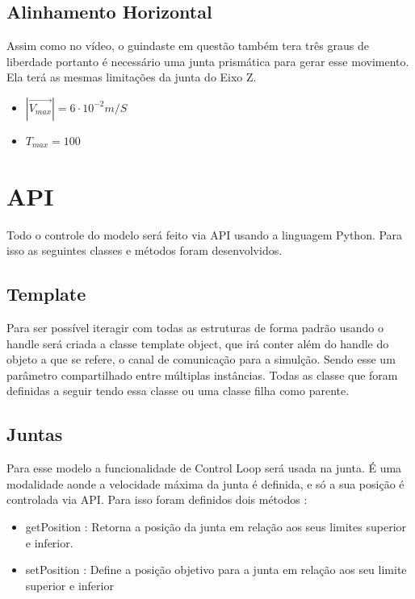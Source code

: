 \documentclass{article}
\begin{document}
        \subsection{Alinhamento Horizontal}

            Assim como no vídeo, o guindaste em questão também tera três graus de liberdade portanto é necessário uma junta 
            prismática para gerar esse movimento. Ela terá as mesmas limitações da junta do Eixo Z.
            \begin{itemize}
                \item \(\left|\vec{V_{max}}\right| = 6\cdot 10^{-2} m/S\)
                \item \(T_{max} = 100\)
            \end{itemize}
    \section{API}

        Todo o controle do modelo será feito via API usando a linguagem Python. Para isso as seguintes classes e métodos foram desenvolvidos. 
        \subsection{Template}

            Para ser possível iteragir com todas as estruturas de forma padrão usando o handle será criada a classe template object, que irá conter além do handle do objeto 
            a que se refere, o canal de comunicação para a simulção. Sendo esse um parâmetro compartilhado entre múltiplas instâncias. Todas as classe que foram definidas a 
            seguir tendo essa classe ou uma classe filha como parente.
        \subsection{Juntas}

            Para esse modelo a funcionalidade de Control Loop será usada na junta. É uma modalidade aonde a velocidade máxima da junta é definida, e só a sua posição é controlada 
            via API. Para isso foram definidos dois métodos :
            \begin{itemize}
                \item getPosition : Retorna a posição da junta em relação aos seus limites superior e inferior.
                \item setPosition : Define a posição objetivo para a junta em relação aos seu limite superior e inferior
            \end{itemize}
\end{document}
